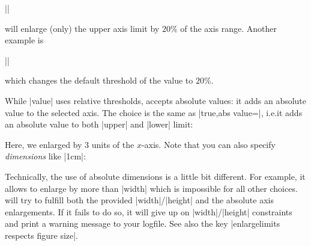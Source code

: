 \begin{pgfplotsxykeylist}
        ||

    will enlarge (only) the upper axis limit by $20\%$ of the axis range.
    Another example is

        ||

    which changes the default threshold of the  value to
    $20\%$.
\begin{codeexample}[]
\end{codeexample}

     While |value| uses relative thresholds,  accepts
     absolute values: it adds an absolute value to the selected axis. The
     choice  is the same as
     |true,abs value=|, i.e.\@ it adds an absolute value to both
     |upper| and |lower| limit:
\begin{codeexample}[]
\end{codeexample}
    \noindent Here, we enlarged by $3$ units of the $x$-axis. Note that you can
    also specify \emph{dimensions} like |1cm|:
\begin{codeexample}[]
\end{codeexample}
    \noindent Technically, the use of absolute dimensions is a little bit
    different. For example, it allows to enlarge by more than |width| which is
    impossible for all other choices. \PGFPlots{} will try to fulfill both the
    provided |width|/|height| and the absolute axis enlargements. If it fails
    to do so, it will give up on |width|/|height| constraints and print a
    warning message to your logfile. See also the key
    |enlargelimits respects figure size|.



\end{pgfplotsxykeylist}
